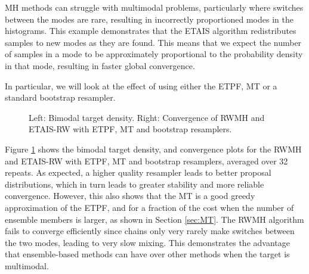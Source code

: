 \documentclass[final]{siamltex}
\newcommand{\revised}{}
\begin{document}
MH methods can struggle
with multimodal problems, particularly where switches between the
modes are rare, resulting in incorrectly proportioned modes in the
histograms. This example demonstrates that the ETAIS algorithm
redistributes samples to new modes as they are found. This means
that we expect the number of samples in a mode to be approximately
proportional to the probability density in that mode, resulting in
faster global convergence. {\revised In particular, we will look at the effect
of using either the ETPF, MT or a standard bootstrap resampler.

\begin{figure}[htb]
\centering 
{}

\caption{Left: Bimodal target density. Right: Convergence of RWMH and
  ETAIS-RW with ETPF, MT and bootstrap resamplers. }
\label{kshdbf}
\end{figure}

Figure \ref{kshdbf} shows the bimodal target density, and convergence
plots for the RWMH and ETAIS-RW with ETPF, MT and bootstrap
resamplers, averaged over 32 repeats. As expected, a higher quality resampler leads to better
proposal distributions, which in turn leads to greater stability and
more reliable convergence. However, this also shows that the MT is a
good greedy approximation of the ETPF, and for a fraction of the cost
when the number of ensemble members is larger, as shown in Section
\ref{sec:MT}. The RWMH algorithm fails to converge efficiently since chains only very rarely
make switches between the two modes, leading to very slow mixing. This
demonstrates the advantage that ensemble-based methods can have over
other methods when the target
is multimodal.

}
\end{document}
